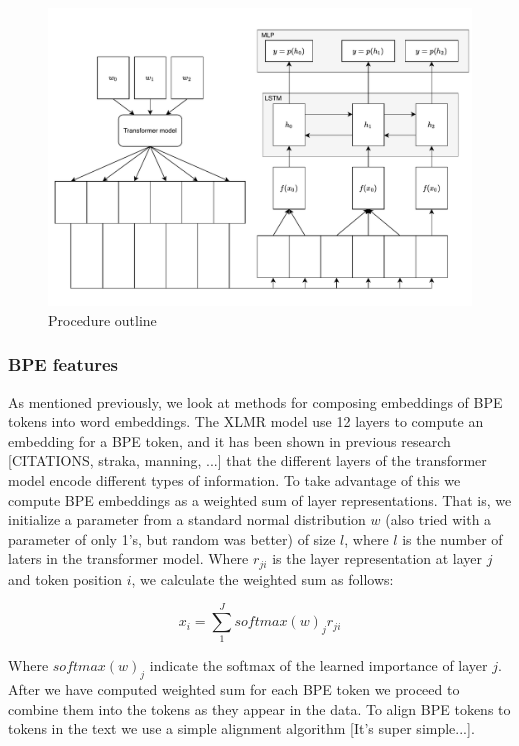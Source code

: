 \documentclass[11pt]{article}
\begin{document}
	\begin{figure}[h!]
		\centering
		\includegraphics[scale=0.5]{model-outline.pdf}
		\caption{\label{fig:model} Procedure outline}
	\end{figure}
	
	\subsubsection{BPE features}

        As mentioned previously, we look at methods for composing
     embeddings of BPE tokens into word embeddings. The XLMR model use
     12 layers to compute an embedding for a BPE token, and it has
     been shown in previous research [CITATIONS, straka, manning, ...]
     that the different layers of the transformer model encode
     different types of information. To take advantage of this we
     compute BPE embeddings as a weighted sum of layer
     representations.  That is, we initialize a parameter from a
     standard normal distribution $w$ (also tried with a parameter of
     only 1's, but random was better) of size $l$, where $l$ is the
     number of laters in the transformer model. Where $r_{ji}$ is the
     layer representation at layer $j$ and token position $i$, we
     calculate the weighted sum as follows:

    \begin{equation}
		x_i = \sum_{1}^{J} softmax(w)_j r_{ji}
	\end{equation}

        Where $softmax(w)_j$ indicate the softmax of the learned
     importance of layer $j$. After we have computed weighted sum for
     each BPE token we proceed to combine them into the tokens as they
     appear in the data. To align BPE tokens to tokens in the text we
     use a simple alignment algorithm [It's super simple...].
    
\end{document}
